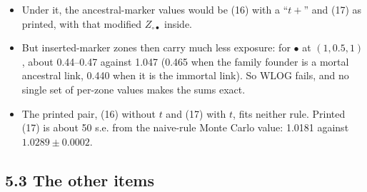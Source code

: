 \documentclass[10pt,]{article}
\providecommand{\tightlist}{%
  \setlength{\itemsep}{0pt}\setlength{\parskip}{0pt}}
\begin{document}
\begin{itemize}
  \begin{itemize}
  \tightlist
  \item
    Under it, the ancestral-marker values would be (16) with a
    ``\(t+\)'' and (17) as printed, with that modified
    \(Z_{\circ\bullet}\) inside.
  \item
    But inserted-marker zones then carry much less exposure: for
    \(\bullet\) at \((1,0.5,1)\), about 0.44--0.47 against 1.047 (0.465
    when the family founder is a mortal ancestral link, 0.440 when it is
    the immortal link). So WLOG fails, and no single set of per-zone
    values makes the sums exact.
  \item
    The printed pair, (16) without \(t\) and (17) with \(t\), fits
    neither rule. Printed (17) is about 50 s.e. from the naive-rule
    Monte Carlo value: 1.0181 against \(1.0289\pm0.0002\).
  \end{itemize}
\end{itemize}

\hypertarget{the-other-items}{%
\subsection{5.3 The other items}\label{the-other-items}}
\end{document}
